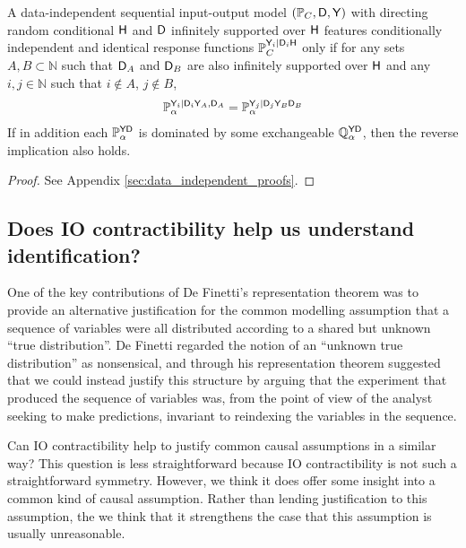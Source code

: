 \begin{theorem}\label{th:infinite_condition_swaps}
A data-independent sequential input-output model $(\mathbb{P}_C,\mathsf{D},\mathsf{Y})$ with directing random conditional $\mathsf{H}$ and $\mathsf{D}$ infinitely supported over $\mathsf{H}$ features conditionally independent and identical response functions $\mathbb{P}_C^{\mathsf{Y}_i|\mathsf{D}_i\mathsf{H}}$ only if for any sets $A,B\subset \mathbb{N}$ such that $\mathsf{D}_A$ and $\mathsf{D}_B$ are also infinitely supported over $\mathsf{H}$ and any $i,j\in \mathbb{N}$ such that $i\not\in A$, $j\not\in B$, 
\begin{align}
\mathbb{P}_\alpha^{\mathsf{Y}_i|\mathsf{D}_i\mathsf{Y}_A,\mathsf{D}_A}=\mathbb{P}_\alpha^{\mathsf{Y}_j|\mathsf{D}_j\mathsf{Y}_B\mathsf{D}_B}
\end{align}
If in addition each $\mathbb{P}_\alpha^{\mathsf{YD}}$ is dominated by some exchangeable $\mathbb{Q}_\alpha^{\mathsf{Y}\mathsf{D}}$, then the reverse implication also holds.
\end{theorem}

\begin{proof}
See Appendix \ref{sec:data_independent_proofs}.
\end{proof}

\subsection[Does IO contractibility help?]{Does IO contractibility help us understand identification?}\label{sec:symmetries_discussion}

One of the key contributions of De Finetti's representation theorem was to provide an alternative justification for the common modelling assumption that a sequence of variables were all distributed according to a shared but unknown ``true distribution''. De Finetti regarded the notion of an ``unknown true distribution'' as nonsensical, and through his representation theorem suggested that we could instead justify this structure by arguing that the experiment that produced the sequence of variables was, from the point of view of the analyst seeking to make predictions, invariant to reindexing the variables in the sequence.

Can IO contractibility help to justify common causal assumptions in a similar way? This question is less straightforward because IO contractibility is not such a straightforward symmetry. However, we think it does offer some insight into a common kind of causal assumption. Rather than lending justification to this assumption, the we think that it strengthens the case that this assumption is usually unreasonable.

